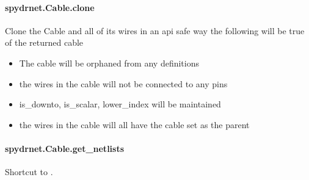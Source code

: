 \documentclass[letterpaper,10pt,english,openany,oneside]{sphinxmanual}
\begin{document}
\paragraph{spydrnet.Cable.clone}
\label{\detokenize{reference/classes/generated/spydrnet.Cable.clone:spydrnet-cable-clone}}\label{\detokenize{reference/classes/generated/spydrnet.Cable.clone::doc}}

\begin{fulllineitems}
\label{\detokenize{reference/classes/generated/spydrnet.Cable.clone:spydrnet.Cable.clone}}
Clone the Cable and all of its wires in an api safe way
the following will be true of the returned cable
\begin{itemize}
\item {} 
The cable will be orphaned from any definitions

\item {} 
the wires in the cable will not be connected to any pins

\item {} 
is\_downto, is\_scalar, lower\_index will be maintained

\item {} 
the wires in the cable will all have the cable set as the parent

\end{itemize}

\end{fulllineitems}



\paragraph{spydrnet.Cable.get\_netlists}
\label{\detokenize{reference/classes/generated/spydrnet.Cable.get_netlists:spydrnet-cable-get-netlists}}\label{\detokenize{reference/classes/generated/spydrnet.Cable.get_netlists::doc}}

\begin{fulllineitems}
\label{\detokenize{reference/classes/generated/spydrnet.Cable.get_netlists:spydrnet.Cable.get_netlists}}
Shortcut to {\hyperref[\detokenize{reference/classes/generated/spydrnet.get_netlists:spydrnet.get_netlists}]{}}.

\end{fulllineitems}
\end{document}
